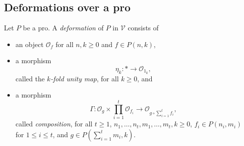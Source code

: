 \documentclass{tac}
\begin{document}
\subsection*{Deformations over a pro}

\begin{definition}
    Let $P$ be a pro. A \emph{deformation} of $P$ in $\mathcal{V}$ consists of \begin{itemize}
    \item an object $\mathcal{O}_{f}$ for all $n,k\geq 0$ and $f\in P(n,k)$,
    \item a morphism
    \[
    \eta_k:*\to \mathcal{O}_{1_k},
    \]
    called the \emph{$k$-fold unity map}, for all $k\geq 0$, and
    \item a morphism
    \[
    \Gamma:\mathcal{O}_{g}\times\prod_{i=1}^t\mathcal{O}_{f_i}\to\mathcal{O}_{g\circ\sum_{i=1}^tf_i},
    \]
   called \emph{composition}, for all $t\geq 1$, $n_1,\dots,n_t,m_1,\dots,m_t,k\geq 0$, $f_i\in P(n_i,m_i)$ for $1\leq i\leq t$, and $g\in P(\sum_{i=1}^tm_i,k)$.
   

\end{itemize}
\end{definition}
\end{document}
